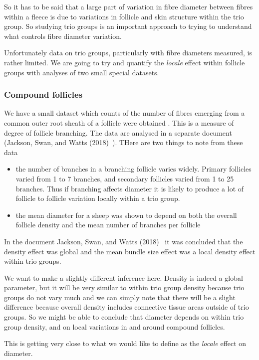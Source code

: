 \documentclass[titlepage]{article}  %
\begin{document}
So it has to be said that a large part of variation in fibre diameter between fibres within a fleece is due to variations in follicle and skin structure within the trio group. So studying trio groups is an important approach to trying to understand what controls fibre diameter variation. 

Unfortunately data on trio groups, particularly with fibre diameters measured, is rather limited.  We are going to try and quantify the {\em locale} effect within follicle groups with analyses of two small special datasets.

\subsubsection{Compound follicles}
We have a small dataset  which counts of the number of fibres emerging from a common outer root sheath of a follicle were obtained .  This is a measure of degree of follicle branching. The data are analysed in a separate document (Jackson, Swan, and Watts (2018)~\cite{jack:18c}). THere are two things to note from these data
\begin{itemize}
\item the number of branches in a branching follicle varies widely. Primary follicles varied from 1 to 7 branches, and secondary follicles varied from 1 to 25 branches. Thus if branching affects diameter it is likely to produce a lot of follicle to follicle variation locally within a trio group.
\item the mean diameter for a sheep was shown to depend on both the overall follicle density and the mean number of branches per follicle
\end{itemize}

In the document Jackson, Swan, and Watts (2018)~\cite{jack:18c}  it was concluded that the density effect was global and the mean bundle size effect was a local density effect within trio groups.

We want to make a slightly different inference here.  Density is indeed a global parameter, but it will be very similar to within trio group density because trio groups do not vary much and we can simply note that there will be a slight difference because overall density includes connective tissue areas outside of trio groups. So we might be able to conclude that diameter depends on within trio group density, and on local variations in and around compound follicles. 

This is getting very close to what we would like to define as the {\em locale} effect on diameter.
\end{document}
